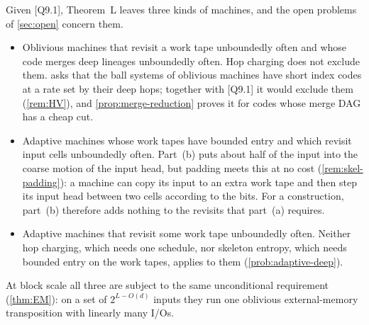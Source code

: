 Given [Q9.1], Theorem~L leaves three kinds of machines, and the open problems of \cref{sec:open} concern them.
\begin{itemize}
\item Oblivious machines that revisit a work tape unboundedly often and whose code merges deep lineages unboundedly often.
Hop charging does not exclude them.  asks that the ball systems of oblivious machines have short index
codes at a rate set by their deep hops; together with [Q9.1] it would exclude them (\cref{rem:HV}), and
\cref{prop:merge-reduction} proves it for codes whose merge DAG has a cheap cut.
\item Adaptive machines whose work tapes have bounded entry and which revisit input cells unboundedly often. Part~(b)
puts about half of the input into the coarse motion of the input head, but padding meets this at no cost
(\cref{rem:skel-padding}): a machine can copy its input to an extra work tape and then step its input head between two
cells according to the bits. For a construction, part~(b) therefore adds nothing to the revisits that part~(a)
requires.
\item Adaptive machines that revisit some work tape unboundedly often. Neither hop charging, which needs one schedule,
nor skeleton entropy, which needs bounded entry on the work tapes, applies to them (\cref{prob:adaptive-deep}).
\end{itemize}
At block scale all three are subject to the same unconditional requirement (\cref{thm:EM}): on a set of $2^{L-O(d)}$
inputs they run one oblivious external-memory transposition with linearly many I/Os.
